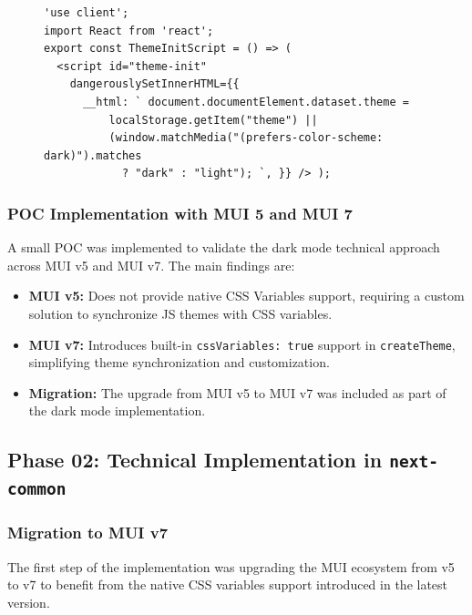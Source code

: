 \begin{figure}[h]
\centering
\begin{lstlisting}[caption={ThemeInitScript.tsx}]
'use client';
import React from 'react';
export const ThemeInitScript = () => (
  <script id="theme-init"
    dangerouslySetInnerHTML={{
      __html: ` document.documentElement.dataset.theme =
          localStorage.getItem("theme") ||
          (window.matchMedia("(prefers-color-scheme: dark)").matches
            ? "dark" : "light"); `, }} /> );
\end{lstlisting}
\label{fig:theme-init-script}
\end{figure}

\subsubsection{POC Implementation with MUI 5 and MUI 7}

A small POC was implemented to validate the dark mode technical approach across MUI v5 and MUI v7. The main findings are:

\begin{itemize}
    \item \textbf{MUI v5:} Does not provide native CSS Variables support, requiring a custom solution to synchronize \ac{JS} themes with \acs{CSS} variables.
    
    \item \textbf{MUI v7:} Introduces built-in \texttt{cssVariables: true} support in \texttt{createTheme}, simplifying theme synchronization and customization.
    
    \item \textbf{Migration:} The upgrade from MUI v5 to MUI v7 was included as part of the dark mode implementation.
\end{itemize}

\subsection{Phase 02: Technical Implementation in \texttt{next-common}}

\subsubsection{Migration to MUI v7}

The first step of the implementation was upgrading the MUI ecosystem from v5 to v7 to benefit from the native CSS variables support introduced in the latest version.

